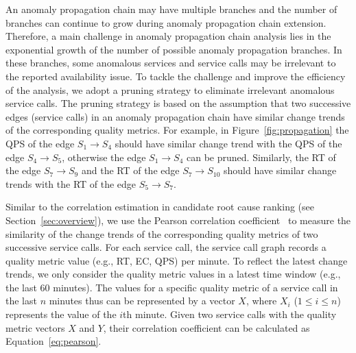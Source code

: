 An anomaly propagation chain may have multiple branches and the number of branches can continue to grow during anomaly propagation chain extension.
Therefore, a main challenge in anomaly propagation chain analysis lies in the exponential growth of the number of possible anomaly propagation branches.
In these branches, some anomalous services and service calls may be irrelevant to the reported availability issue.
To tackle the challenge and improve the efficiency of the analysis, we adopt a pruning strategy to eliminate irrelevant anomalous service calls.
The pruning strategy is based on the assumption that two successive edges (service calls) in an anomaly propagation chain have similar change trends of the corresponding quality metrics.
For example, in Figure~\ref{fig:propagation} the QPS of the edge $S_1 \rightarrow S_4$ should have similar change trend with the QPS of the edge $S_4 \rightarrow S_5$, otherwise the edge $S_1 \rightarrow S_4$ can be pruned.
Similarly, the RT of the edge $S_7 \rightarrow S_9$ and the RT of the edge $S_7 \rightarrow S_{10}$ should have similar change trends with the RT of the edge $S_5 \rightarrow S_7$.


Similar to the correlation estimation in candidate root cause ranking (see Section~\ref{sec:overview}), we use the Pearson correlation coefficient~\cite{perlationcorrelation} to measure the similarity of the change trends of the corresponding quality metrics of two successive service calls.
For each service call, the service call graph records a quality metric value (e.g., RT, EC, QPS) per minute.
To reflect the latest change trends, we only consider the quality metric values in a latest time window (e.g., the last 60 minutes).
The values for a specific quality metric of a service call in the last $n$ minutes thus can be represented by a vector $X$, where $X_i$ ($1 \leq i \leq n$) represents the value of the $i$th minute.
Given two service calls with the quality metric vectors $X$ and $Y$, their correlation coefficient can be calculated as Equation~\ref{eq:pearson}.

